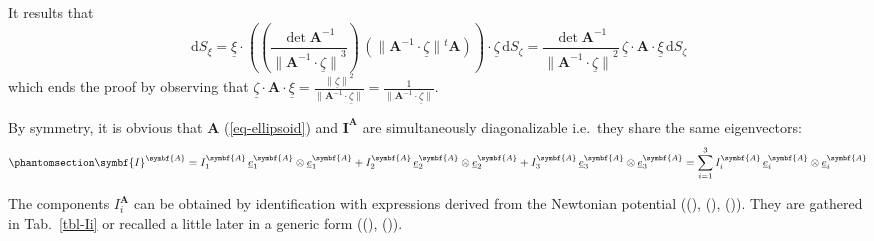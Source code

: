 \documentclass[
  a4paper,
  numbers=noendperiod,
  DIV=12]{scrreprt}
\newcommand{\uu}[1]{{\symbf{{#1}}}}
\newcommand{\uv}[1]{{\underline{{#1}}}}
\newcommand{\trans}[1]{{{}^{t}{#1}}}
\newcommand{\norm}[1]{{\lVert{{#1}}\rVert}}
\newcommand{\ud}{{\,\mathrm{d}}}
\begin{document}
\begin{tcolorbox}
It results that \[
\ud S_{\xi}=\uv{\xi}\cdot\left(\left(\frac{\det{\uu{A}^{-1}}}{\norm{\uu{A}^{-1}\cdot\uv{\zeta}}^3}\right)\,
\left(\norm{\uu{A}^{-1}\cdot\uv{\zeta}}\trans{\uu{A}}\right)\right)\cdot\uv{\zeta}
\ud S_{\zeta}
=
\frac{\det{\uu{A}^{-1}}}{\norm{\uu{A}^{-1}\cdot\uv{\zeta}}^2}\,
\uv{\zeta}\cdot\uu{A}\cdot\uv{\xi}
\ud S_{\zeta}
\] which ends the proof by observing that
\(\uv{\zeta}\cdot\uu{A}\cdot\uv{\xi}=\frac{\norm{\uv{\zeta}}^2}{\norm{\uu{A}^{-1}\cdot\uv{\zeta}}}=\frac{1}{\norm{\uu{A}^{-1}\cdot\uv{\zeta}}}\).

\end{tcolorbox}

By symmetry, it is obvious that \(\uu{A}\) (\ref{eq-ellipsoid}) and
\(\uu{I}^{\uu{A}}\) are simultaneously diagonalizable i.e.~they share
the same eigenvectors:
\begin{equation}\protect\phantomsection\label{eq-decI}{
\uu{I}^{\uu{A}}=I^{\uu{A}}_1\,\uv{e}^{\uu{A}}_1\otimes\uv{e}^{\uu{A}}_1 + I^{\uu{A}}_2\,\uv{e}^{\uu{A}}_2\otimes\uv{e}^{\uu{A}}_2 + I^{\uu{A}}_3\,\uv{e}^{\uu{A}}_3\otimes\uv{e}^{\uu{A}}_3 = \sum_{i=1}^3 I^{\uu{A}}_i\,\uv{e}^{\uu{A}}_i\otimes\uv{e}^{\uu{A}}_i
}\end{equation}

The components \(I^{\uu{A}}_i\) can be obtained by identification with
expressions derived from the Newtonian potential
((),
(),
()). They are gathered in
Tab.~\ref{tbl-Ii} or recalled a little later in a generic form
((),
()).
\end{document}
